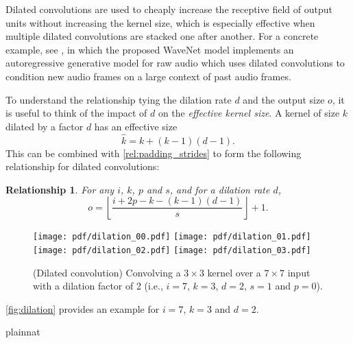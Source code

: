 \documentclass[notitlepage]{report}
\newtheorem{relationship}{Relationship}
\begin{document}
Dilated convolutions are used to cheaply increase the receptive field of output
units without increasing the kernel size, which is especially effective
when multiple dilated convolutions are stacked one after another. For a
concrete example, see \citet{oord2016wavenet}, in which the proposed WaveNet
model implements an autoregressive generative model for raw audio which uses
dilated convolutions to condition new audio frames on a large context of past
audio frames.

To understand the relationship tying the dilation rate $d$ and the output size
$o$, it is useful to think of the impact of $d$ on the {\em effective kernel
size}. A kernel of size $k$ dilated by a factor $d$ has an effective size
\begin{equation*}
    \hat{k} = k + (k - 1)(d - 1).
\end{equation*}
This can be combined with \autoref{rel:padding_strides} to form the following
relationship for dilated convolutions:

\begin{relationship}\label{rel:dilation}
For any $i$, $k$, $p$ and $s$, and for a dilation rate $d$,
\begin{equation*}
    o = \left\lfloor \frac{i + 2p - k - (k - 1)(d - 1)}{s} \right\rfloor + 1.
\end{equation*}
\end{relationship}

\begin{figure}[h]
    \centering
    \texttt{[image: pdf/dilation\_00.pdf]}
    \texttt{[image: pdf/dilation\_01.pdf]}
    \texttt{[image: pdf/dilation\_02.pdf]}
    \texttt{[image: pdf/dilation\_03.pdf]}
    \caption{\label{fig:dilation} (Dilated convolution)
        Convolving a $3 \times 3$ kernel over a $7 \times 7$ input with a
        dilation factor of 2 (i.e., $i = 7$, $k = 3$, $d = 2$, $s = 1$ and
        $p = 0$).}
\end{figure}

\noindent \autoref{fig:dilation} provides an example for $i = 7$, $k = 3$ and
$d = 2$.


%
 {plainnat}
\end{document}

